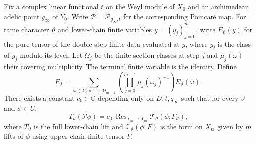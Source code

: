 \begin{lemma}
\label{lem:a-seesaw-unfolding}
\emitthmsource
Fix a complex linear functional $t$ on the Weyl module of $X_0$ and an archimedean adelic point $g_\infty$ of $Y_0$. Write $\mathcal P=\mathcal P_{g_\infty,t}$ for the corresponding Poincaré map. For tame character $\vartheta$ and lower-chain finite variables $y=(y_j)_{j=0}^m$, write $E_\vartheta(\bar y)$ for the pure tensor of the double-step finite data evaluated at $y$, where $\bar y_j$ is the class of $y_j$ modulo its level. Let $\Omega_j$ be the finite section classes at step $j$ and $\mu_j(\omega)$ their covering multiplicity. The terminal finite variable is the identity. Define
\[
 F_\vartheta
 =\sum_{\omega\in\Omega_0\times\cdots\times\Omega_{m-1}}
  \left(\prod_{j=0}^{m-1}\mu_j(\omega_j)^{-1}\right)E_\vartheta(\omega).
\]
There exists a constant $c_0\in\mathbb C$ depending only on $D,t,g_\infty$ such that for every $\vartheta$ and $\phi\in U$,
\[
 T_\vartheta(\mathcal P\phi)
   = c_0\,\operatorname{Res}_{X_m\to Y_m}
            \mathcal T_\vartheta(\phi;F_\vartheta),
\]
where $T_\vartheta$ is the full lower-chain lift and $\mathcal T_\vartheta(\phi;F)$ is the form on $X_m$ given by $m$ lifts of $\phi$ using upper-chain finite tensor $F$.
\end{lemma}
